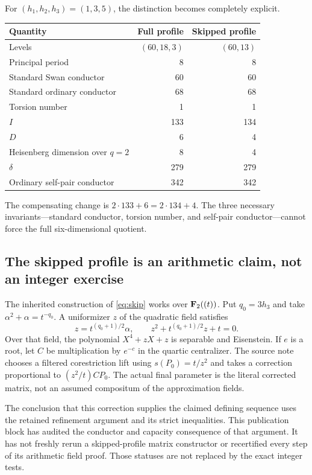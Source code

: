 For $(h_1,h_2,h_3)=(1,3,5)$, the distinction becomes completely explicit.
\begin{center}\begin{tabular}{lrr}\toprule
Quantity & Full profile & Skipped profile\\\midrule
Levels & $(60,18,3)$ & $(60,13)$\\
Principal period & 8 & 8\\
Standard Swan conductor & 60 & 60\\
Standard ordinary conductor & 68 & 68\\
Torsion number & 1 & 1\\
$I$ & 133 & 134\\
$D$ & 6 & 4\\
Heisenberg dimension over $q=2$ & 8 & 4\\
$\delta$ & 279 & 279\\
Ordinary self-pair conductor & 342 & 342\\\bottomrule
\end{tabular}\end{center}
The compensating change is $2\cdot133+6=2\cdot134+4$. The three necessary invariants---standard conductor, torsion number, and self-pair conductor---cannot force the full six-dimensional quotient.

\subsection{The skipped profile is an arithmetic claim, not an integer exercise}
The inherited construction of \eqref{eq:skip} works over $\mathbf F_2((t))$. Put $q_0=3h_3$ and take $\alpha^2+\alpha=t^{-q_0}$. A uniformizer $z$ of the quadratic field satisfies
\[
 z=t^{(q_0+1)/2}\alpha,
 \qquad z^2+t^{(q_0+1)/2}z+t=0.
\]
Over that field, the polynomial $X^4+zX+z$ is separable and Eisenstein. If $e$ is a root, let $C$ be multiplication by $e^{-c}$ in the quartic centralizer. The source note chooses a filtered corestriction lift using $s(P_0)=t/z^2$ and takes a correction proportional to $(z^2/t)CP_0$. The actual final parameter is the literal corrected matrix, not an assumed compositum of the approximation fields.

The conclusion that this correction supplies the claimed defining sequence uses the retained refinement argument and its strict inequalities. This publication block has audited the conductor and capacity consequence of that argument. It has not freshly rerun a skipped-profile matrix constructor or recertified every step of its arithmetic field proof. Those statuses are not replaced by the exact integer tests.

